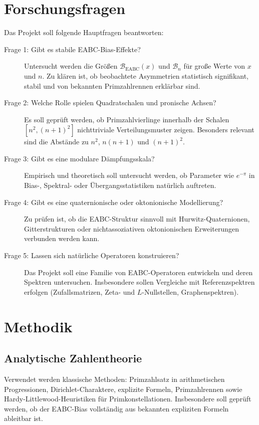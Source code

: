 \documentclass[11pt,a4paper,bibliography=totoc]{scrartcl}
\begin{document}
	\section{Forschungsfragen}
	Das Projekt soll folgende Hauptfragen beantworten:
	\begin{description}
		\item[Frage 1: Gibt es stabile EABC-Bias-Effekte?] Untersucht werden die Größen $\mathcal{B}_{\mathrm{EABC}}(x)$ und $\mathcal{B}_n$ für große Werte von $x$ und $n$. Zu klären ist, ob beobachtete Asymmetrien statistisch signifikant, stabil und von bekannten Primzahlrennen erklärbar sind.
		\item[Frage 2: Welche Rolle spielen Quadratschalen und pronische Achsen?] Es soll geprüft werden, ob Primzahlvierlinge innerhalb der Schalen $[n^2, (n+1)^2]$ nichttriviale Verteilungsmuster zeigen. Besonders relevant sind die Abstände zu $n^2$, $n(n+1)$ und $(n+1)^2$.
		\item[Frage 3: Gibt es eine modulare Dämpfungsskala?] Empirisch und theoretisch soll untersucht werden, ob Parameter wie $e^{-\pi}$ in Bias-, Spektral- oder Übergangsstatistiken natürlich auftreten.
		\item[Frage 4: Gibt es eine quaternionische oder oktonionische Modellierung?] Zu prüfen ist, ob die EABC-Struktur sinnvoll mit Hurwitz-Quaternionen, Gitterstrukturen oder nichtassoziativen oktonionischen Erweiterungen verbunden werden kann.
		\item[Frage 5: Lassen sich natürliche Operatoren konstruieren?] Das Projekt soll eine Familie von EABC-Operatoren entwickeln und deren Spektren untersuchen. Insbesondere sollen Vergleiche mit Referenzspektren erfolgen (Zufallsmatrizen, Zeta- und $L$-Nullstellen, Graphenspektren).
	\end{description}
	
	\section{Methodik}
	
	\subsection{Analytische Zahlentheorie}
	Verwendet werden klassische Methoden: Primzahlsatz in arithmetischen Progressionen, Dirichlet-Charaktere, explizite Formeln, Primzahlrennen sowie Hardy-Littlewood-Heuristiken für Primkonstellationen. Insbesondere soll geprüft werden, ob der EABC-Bias vollständig aus bekannten expliziten Formeln ableitbar ist.
	
\end{document}
